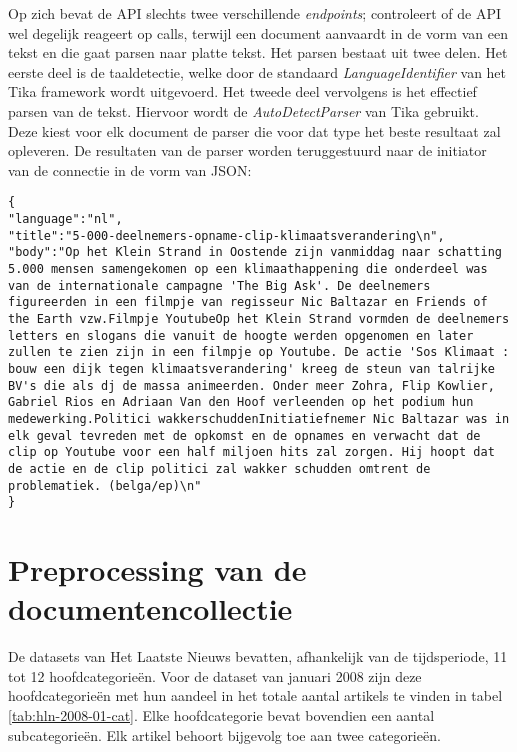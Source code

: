 Op zich bevat de API slechts twee verschillende \textit{endpoints};  controleert of de API wel degelijk reageert op calls, terwijl  een document aanvaardt in de vorm van een tekst en die gaat parsen naar platte tekst. Het parsen bestaat uit twee delen. Het eerste deel is de taaldetectie, welke door de standaard \textit{LanguageIdentifier} van het Tika framework wordt uitgevoerd. Het tweede deel vervolgens is het effectief parsen van de tekst. Hiervoor wordt de \textit{AutoDetectParser} van Tika gebruikt. Deze kiest voor elk document de parser die voor dat type het beste resultaat zal opleveren.
De resultaten van de parser worden teruggestuurd naar de initiator van de connectie in de vorm van JSON:

\begin{lstlisting}
{
"language":"nl",
"title":"5-000-deelnemers-opname-clip-klimaatsverandering\n",
"body":"Op het Klein Strand in Oostende zijn vanmiddag naar schatting 5.000 mensen samengekomen op een klimaathappening die onderdeel was van de internationale campagne 'The Big Ask'. De deelnemers figureerden in een filmpje van regisseur Nic Baltazar en Friends of the Earth vzw.Filmpje YoutubeOp het Klein Strand vormden de deelnemers letters en slogans die vanuit de hoogte werden opgenomen en later zullen te zien zijn in een filmpje op Youtube. De actie 'Sos Klimaat : bouw een dijk tegen klimaatsverandering' kreeg de steun van talrijke BV's die als dj de massa animeerden. Onder meer Zohra, Flip Kowlier, Gabriel Rios en Adriaan Van den Hoof verleenden op het podium hun medewerking.Politici wakkerschuddenInitiatiefnemer Nic Baltazar was in elk geval tevreden met de opkomst en de opnames en verwacht dat de clip op Youtube voor een half miljoen hits zal zorgen. Hij hoopt dat de actie en de clip politici zal wakker schudden omtrent de problematiek. (belga/ep)\n"
}
\end{lstlisting} 

\section{Preprocessing van de documentencollectie}\label{preprocessing}
De datasets van Het Laatste Nieuws bevatten, afhankelijk van de tijdsperiode, 11 tot 12 hoofdcategorie\"en. Voor de dataset van januari 2008 zijn deze hoofdcategorie\"en met hun aandeel in het totale aantal artikels te vinden in tabel \ref{tab:hln-2008-01-cat}. Elke hoofdcategorie bevat bovendien een aantal subcategorie\"en. Elk artikel behoort bijgevolg toe aan twee categorie\"en. 

